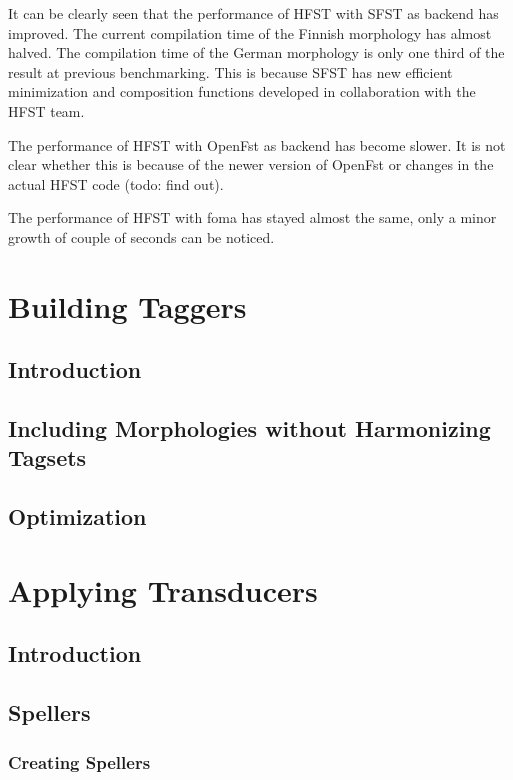 \documentclass{llncs}
\begin{document}
It can be clearly seen that the performance of HFST with SFST as backend 
has improved. The current compilation time of the Finnish morphology has almost
halved. The compilation time of the German morphology is only one third of the
result at previous benchmarking. 
This is because SFST has new efficient minimization and composition functions
developed in collaboration with the HFST team.

The performance of HFST with OpenFst as backend has become slower. It is not
clear whether this is because of the newer version of OpenFst or changes in the 
actual HFST code (todo: find out).

The performance of HFST with foma has stayed almost the same, only a minor
growth of couple of seconds can be noticed. 
 

\section{Building Taggers}

\subsection{Introduction}

\subsection{Including Morphologies without Harmonizing Tagsets}

\subsection{Optimization}

\section{Applying Transducers}

\subsection{Introduction}

\subsection{Spellers}

\subsubsection{Creating Spellers}
\end{document}
